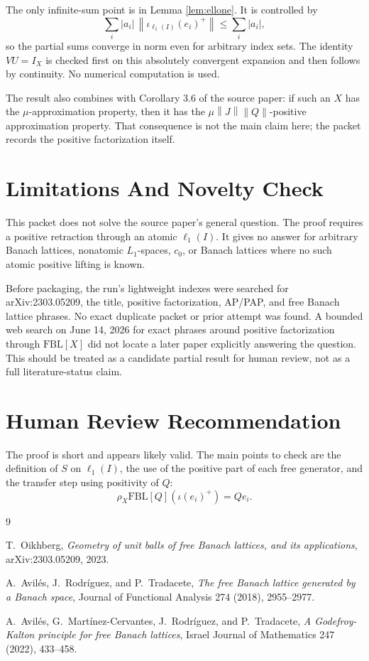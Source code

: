 \documentclass[11pt]{article}
\newcommand{\FBL}{\mathrm{FBL}}
\newcommand{\Id}{I}
\newcommand{\norm}[1]{\left\lVert #1 \right\rVert}
\begin{document}
The only infinite-sum point is in Lemma \ref{lem:ellone}.  It is controlled by
\[
\sum_i |a_i|\,\norm{\iota_{\ell_1(I)}(e_i)^+}
\leq \sum_i |a_i|,
\]
so the partial sums converge in norm even for arbitrary index sets.  The
identity \(VU=\Id_X\) is checked first on this absolutely convergent expansion
and then follows by continuity.  No numerical computation is used.

The result also combines with Corollary 3.6 of the source paper: if such an
\(X\) has the \(\mu\)-approximation property, then it has the
\(\mu\norm{J}\norm{Q}\)-positive approximation property.  That consequence is
not the main claim here; the packet records the positive factorization itself.

\section*{Limitations And Novelty Check}

This packet does not solve the source paper's general question.  The proof
requires a positive retraction through an atomic \(\ell_1(I)\).  It gives no
answer for arbitrary Banach lattices, nonatomic \(L_1\)-spaces, \(c_0\), or
Banach lattices where no such atomic positive lifting is known.

Before packaging, the run's lightweight indexes were searched for
arXiv:2303.05209, the title, positive factorization, AP/PAP, and free Banach
lattice phrases.  No exact duplicate packet or prior attempt was found.  A
bounded web search on June 14, 2026 for exact phrases around positive
factorization through \(\FBL[X]\) did not locate a later paper explicitly
answering the question.  This should be treated as a candidate partial result
for human review, not as a full literature-status claim.

\section*{Human Review Recommendation}

The proof is short and appears likely valid.  The main points to check are the
definition of \(S\) on \(\ell_1(I)\), the use of the positive part of each free
generator, and the transfer step using positivity of \(Q\):
\[
\rho_X\FBL[Q](\iota(e_i)^+)=Qe_i.
\]

\begin{thebibliography}{9}

T.~Oikhberg,
\emph{Geometry of unit balls of free Banach lattices, and its applications},
arXiv:2303.05209, 2023.

A.~Avil\'es, J.~Rodr\'iguez, and P.~Tradacete,
\emph{The free Banach lattice generated by a Banach space},
Journal of Functional Analysis 274 (2018), 2955--2977.

A.~Avil\'es, G.~Mart\'inez-Cervantes, J.~Rodr\'iguez, and P.~Tradacete,
\emph{A Godefroy-Kalton principle for free Banach lattices},
Israel Journal of Mathematics 247 (2022), 433--458.

\end{thebibliography}
\end{document}
